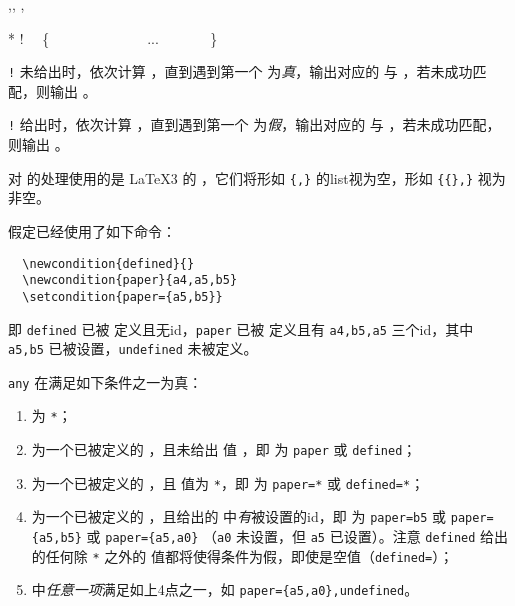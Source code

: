 \documentclass{ctxdoc}
\begin{document}
\begin{function}{
	\conditioncase,\conditioncaseTF,
	\econditioncase,\econditioncaseTF
}
	\begin{syntax}
         * !
        ~~\{
        ~~~~ 
        ~~~~ 
        ~~~~...
        ~~~~ 
        ~~\}
        ~~
        ~~
	\end{syntax}
	\verb|!| 未给出时，依次计算 ，直到遇到第一个  为\emph{真}，输出对应的  与 ，若未成功匹配，则输出 。

	\verb|!| 给出时，依次计算 ，直到遇到第一个  为\emph{假}，输出对应的  与 ，若未成功匹配，则输出 。
\end{function}

\begin{texnote}
	对  的处理使用的是 \LaTeX3 的 ，它们将形如 \verb|{,}| 的list视为空，形如 \verb|{{},}| 视为非空。
\end{texnote}

假定已经使用了如下命令：
\begin{verbatim}
  \newcondition{defined}{}
  \newcondition{paper}{a4,a5,b5}
  \setcondition{paper={a5,b5}}
\end{verbatim}
即 \verb|defined| 已被  定义且无id，\verb|paper| 已被  定义且有 \verb|a4,b5,a5| 三个id，其中 \verb|a5,b5| 已被设置，\verb|undefined| 未被定义。

\verb|any| 在满足如下条件之一为真：
\begin{enumerate}
    \item {} 为 \verb|*|；
    \item {} 为一个已被定义的 ，且未给出  值 ，即  为 \verb|paper| 或 \verb|defined|；
    \item {} 为一个已被定义的 ，且  值为 \verb|*|，即  为 \verb|paper=*| 或 \verb|defined=*|；
    \item {} 为一个已被定义的 ，且给出的  中\emph{有}被设置的id，即  为 \verb|paper=b5| 或 \verb|paper={a5,b5}| 或 \verb|paper={a5,a0}| （\verb|a0| 未设置，但 \verb|a5| 已设置）。注意 \verb|defined| 给出的任何除 \verb|*| 之外的  值都将使得条件为假，即使是空值（\verb|defined=|）；
    \item {} 中\emph{任意一项}满足如上4点之一，如 \verb|paper={a5,a0},undefined|。
\end{enumerate}
\end{document}
